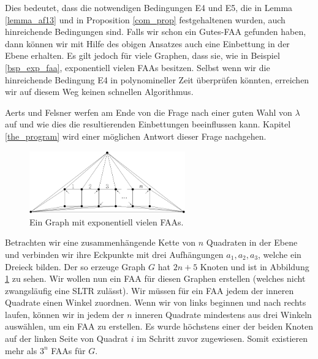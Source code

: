 \begin{remark}
Dies bedeutet, dass die notwendigen Bedingungen E4 und E5, die in Lemma \ref{lemma_af13} und in Proposition \ref{com_prop} festgehaltenen wurden, auch hinreichende Bedingungen sind. Falls wir schon ein Gutes-FAA gefunden haben, dann können wir mit Hilfe des obigen Ansatzes auch eine Einbettung in der Ebene erhalten. Es gilt jedoch für viele Graphen, dass sie, wie in Beispiel \ref{bsp_exp_faa}, exponentiell vielen FAAs besitzen. Selbst wenn wir die hinreichende Bedingung E4 in polynomineller Zeit überprüfen könnten, erreichen wir auf diesem Weg keinen schnellen Algorithmus.
\end{remark}

Aerts und Felsner werfen am Ende von \cite{af13} die Frage nach einer guten Wahl von $\lambda$ auf und wie dies die resultierenden Einbettungen beeinflussen kann. Kapitel \ref{the_program} wird einer möglichen Antwort dieser Frage nachgehen.

\begin{figure}
	\centering
  \includegraphics[width=0.6\textwidth]{exp_faa.png}
  \caption{Ein Graph mit exponentiell vielen FAAs.}
  \label{exp_faa}
\end{figure}

\begin{example}\label{bsp_exp_faa}
Betrachten wir eine zusammenhängende Kette von $n$ Quadraten in der Ebene und verbinden wir ihre Eckpunkte mit drei Aufhängungen $a_1,a_2,a_3$, welche ein Dreieck bilden. Der so erzeuge Graph $G$ hat $2n+5$ Knoten und ist in Abbildung \ref{exp_faa} zu sehen. Wir wollen nun ein FAA für diesen Graphen erstellen (welches nicht zwangsläufig eine SLTR zulässt). Wir müssen für ein FAA jedem der inneren Quadrate einen Winkel zuordnen. Wenn wir von links beginnen und nach rechts laufen, können wir in jedem der $n$ inneren Quadrate mindestens aus drei Winkeln auswählen, um ein FAA zu erstellen. Es wurde höchstens einer der beiden Knoten auf der linken Seite von Quadrat $i$ im Schritt zuvor zugewiesen. Somit existieren mehr als $3^n$ FAAs für $G.$
\end{example}
